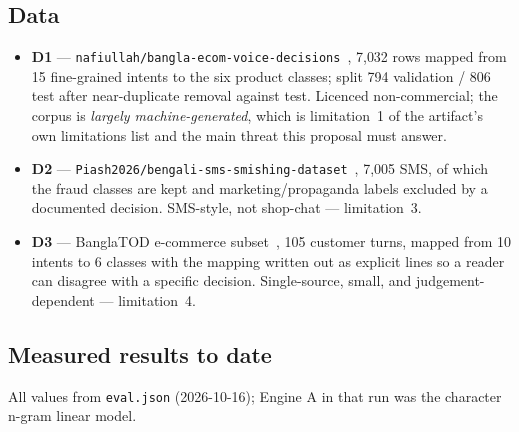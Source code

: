 \documentclass[11pt]{article}
\begin{document}
\subsection{Data}
\label{sec:data}
\begin{itemize}[leftmargin=*,itemsep=1pt,topsep=3pt]
      \item \textbf{D1} --- \texttt{nafiullah/bangla-ecom-voice-decisions}~\cite{d1},
      7{,}032 rows mapped from 15 fine-grained intents to the six product
      classes; split 794 validation / 806 test after near-duplicate removal
      against test. Licenced non-commercial; the corpus is \emph{largely
      machine-generated}, which is limitation~1 of the artifact's own
      limitations list and the main threat this proposal must answer.
      \item \textbf{D2} --- \texttt{Piash2026/bengali-sms-smishing-dataset}~\cite{d2},
      7{,}005 SMS, of which the fraud classes are kept and marketing/propaganda
      labels excluded by a documented decision. SMS-style, not shop-chat ---
      limitation~3.
      \item \textbf{D3} --- BanglaTOD e-commerce subset~\cite{banglatod}, 105 customer turns,
      mapped from 10 intents to 6 classes with the mapping written out as
      explicit lines so a reader can disagree with a specific decision.
      Single-source, small, and judgement-dependent --- limitation~4.
\end{itemize}

\subsection{Measured results to date}
All values from \texttt{eval.json} (2026-10-16); Engine A in that run was the
character n-gram linear model.
\end{document}
